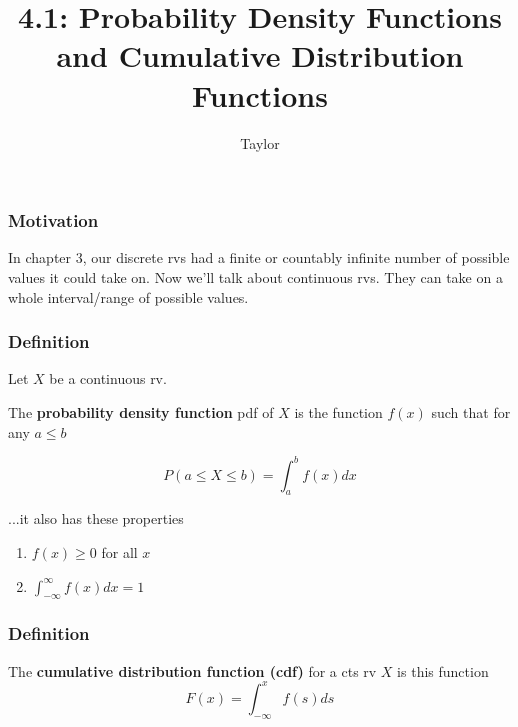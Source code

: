 \documentclass{beamer}
\title["4.1"]{4.1: Probability Density Functions and Cumulative Distribution Functions}
\author{Taylor}
\institute[UVA] 
{
University of Virginia \\
\medskip
\textit{} 
}
\date{}
\begin{document}

\begin{frame}
\titlepage 
\end{frame}

\begin{frame}
\frametitle{Motivation}

In chapter 3, our discrete rvs had a finite or countably infinite number of possible values it could take on. Now we'll talk about continuous rvs. They can take on a whole interval/range of possible values. 

\end{frame}


\begin{frame}
\frametitle{Definition}

Let $X$ be a continuous rv. 
\begin{definition}
The \textbf{probability density function} pdf of $X$ is the function $f(x)$ such that for any $a \le b$

\[
P(a \le X \le b) = \int_a^b f(x) dx
\]
\end{definition}

...it also has these properties
\begin{enumerate}
\item $f(x) \ge 0$ for all $x$
\item $\int_{-\infty}^{\infty}f(x) dx = 1$
\end{enumerate}

\end{frame}

\begin{frame}
\frametitle{Definition}

\begin{definition}
The \textbf{cumulative distribution function (cdf)} for a cts rv $X$ is this function
\[
F(x) = \int_{-\infty}^x f(s) ds
\]
\end{definition}

\end{frame}

\end{document}
